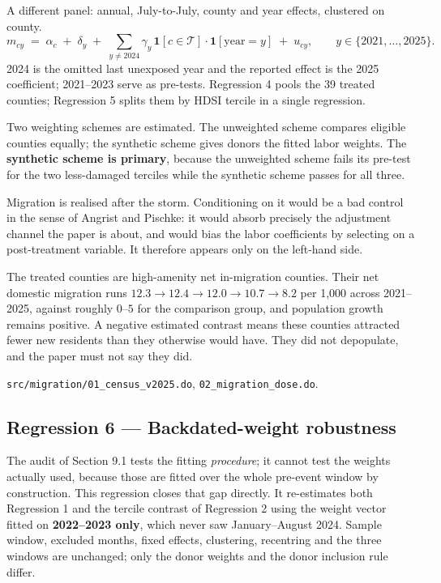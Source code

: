 \documentclass[11pt,a4paper]{article}
\newcommand{\caution}[2]{\begin{tcolorbox}[warnbox,title={#1}]#2\end{tcolorbox}}
\newcommand{\file}[1]{\texttt{\small #1}}
\begin{document}
A different panel: annual, July-to-July, county and year effects, clustered on
county.
\[
m_{cy} \;=\; \alpha_c \;+\; \delta_y \;+\; \sum_{y\neq 2024}\gamma_y\,
\mathbf{1}[c\in\mathcal{T}]\cdot\mathbf{1}[\text{year}=y] \;+\; u_{cy},
\qquad y \in \{2021,\dots,2025\}.
\]
2024 is the omitted last unexposed year and the reported effect is the 2025
coefficient; 2021--2023 serve as pre-tests. Regression 4 pools the 39 treated
counties; Regression 5 splits them by HDSI tercile in a single regression.

Two weighting schemes are estimated. The unweighted scheme compares eligible
counties equally; the synthetic scheme gives donors the fitted labor weights.
The \textbf{synthetic scheme is primary}, because the unweighted scheme fails
its pre-test for the two less-damaged terciles while the synthetic scheme
passes for all three.

\caution{Migration is an outcome, never a control}{%
Migration is realised after the storm. Conditioning on it would be a bad
control in the sense of Angrist and Pischke: it would absorb precisely the
adjustment channel the paper is about, and would bias the labor coefficients by
selecting on a post-treatment variable. It therefore appears only on the
left-hand side.}

\caution{A negative contrast is slower in-migration, not depopulation}{%
The treated counties are high-amenity net in-migration counties. Their net
domestic migration runs $12.3 \to 12.4 \to 12.0 \to 10.7 \to 8.2$ per 1{,}000
across 2021--2025, against roughly $0$--$5$ for the comparison group, and
population growth remains positive. A negative estimated contrast means these
counties attracted fewer new residents than they otherwise would have. They did
not depopulate, and the paper must not say they did.}

\file{src/migration/01\_census\_v2025.do}, \file{02\_migration\_dose.do}.

\subsection{Regression 6 --- Backdated-weight robustness}

The audit of Section 9.1 tests the fitting \emph{procedure}; it cannot test the
weights actually used, because those are fitted over the whole pre-event window
by construction. This regression closes that gap directly. It re-estimates both
Regression 1 and the tercile contrast of Regression 2 using the weight vector
fitted on \textbf{2022--2023 only}, which never saw January--August 2024.
Sample window, excluded months, fixed effects, clustering, recentring and the
three windows are unchanged; only the donor weights and the donor inclusion
rule differ.
\end{document}
